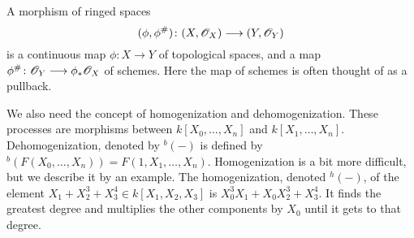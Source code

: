 \begin{definition}
A morphism of ringed spaces
\begin{equation*}
    (\phi, \phi^\#)\colon (X, \mathscr{O}_X)\longrightarrow (Y, \mathscr{O}_Y)
\end{equation*}
is a continuous map $\phi\colon X\longrightarrow Y$ of topological spaces, and a map $\phi^\#\colon \mathscr{O}_Y\longrightarrow \phi_*\mathscr{O}_X$ of schemes. Here the map of schemes is often thought of as a pullback. 
\end{definition}


We also need the concept of homogenization and dehomogenization. These processes are morphisms between $k[X_0, \ldots, X_n]$ and $k[X_1, \ldots, X_n]$. Dehomogenization, denoted by $^b(-)$ is defined by $^b(F(X_0, \ldots, X_n))= F(1, X_1, \ldots, X_n)$. Homogenization is a bit more difficult, but we describe it by an example. The homogenization, denoted $^h(-)$, of the element $X_1+X_2^3+X_3^4 \in k[X_1, X_2, X_3]$ is $X_0^3X_1 + X_0X_2^3+X_3^4$. It finds the greatest degree and multiplies the other components by $X_0$ until it gets to that degree. 

